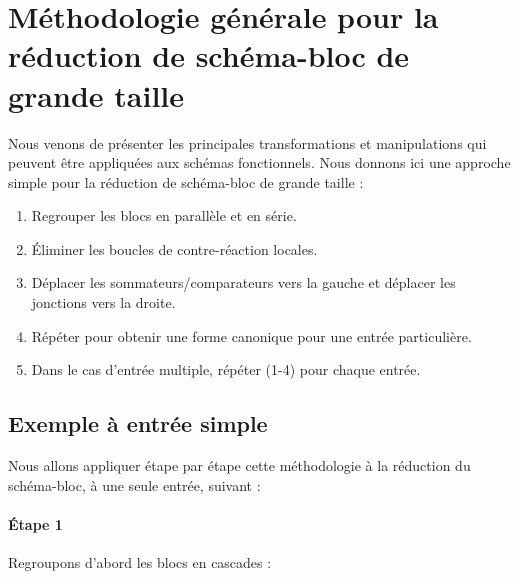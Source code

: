 \section[Réduction de schéma-bloc de grande taille]
{Méthodologie générale pour la réduction de schéma-bloc de grande taille}
Nous venons de présenter les principales transformations et manipulations qui 
peuvent être appliquées aux schémas fonctionnels. Nous donnons ici une 
approche simple pour la réduction de schéma-bloc de grande 
taille \cite{Ostertag}:
\begin{enumerate}
    \item Regrouper les blocs en parallèle et en série.
    \item \'Eliminer les boucles de contre-réaction locales.
    \item Déplacer les sommateurs/comparateurs vers la gauche et déplacer les 
          jonctions vers la droite.
    \item Répéter pour obtenir une forme canonique pour une entrée particulière.
    \item Dans le cas d'entrée multiple, répéter (1-4) pour chaque entrée. 
\end{enumerate}
\subsection{Exemple à entrée simple}
Nous allons appliquer étape par étape cette méthodologie à la réduction du 
schéma-bloc, à une seule entrée, suivant :
\begin{center}
    
\end{center}
\paragraph{\'Etape 1}
Regroupons d'abord les blocs en cascades :
\begin{center}
    
\end{center}
